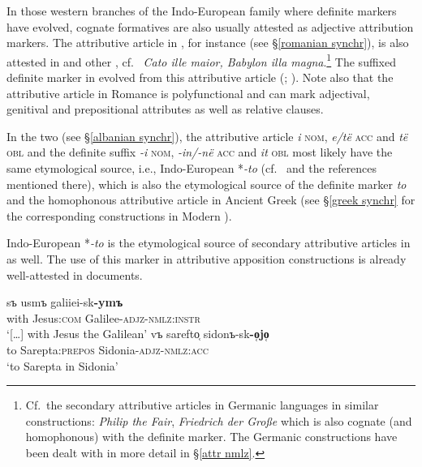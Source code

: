 {\largerpage
In those western branches of the Indo-European family where definite markers have evolved, cognate formatives are also usually attested as adjective attribution markers. The attributive article in , for instance (see \S\ref{romanian synchr}), is also attested in  and other , cf.~ \textit{Cato ille maior, Babylon illa magna}.\footnote{Cf.~the secondary attributive articles in Germanic languages in similar constructions:  \textit{Philip the Fair},  \textit{Friedrich der Große} which is also cognate (and homophonous) with the definite marker. The Germanic constructions have been dealt with in more detail in \S\ref{attr nmlz}.} The suffixed definite marker in  evolved from this attributive article (\citealt{gamillscheg1937}; \citealt[5]{nocentini1996}). Note also that the attributive article in Romance is polyfunctional and can mark adjectival, genitival and prepositional attributes as well as relative clauses.

In the two  (see \S\ref{albanian synchr}), the attributive article \textit{i} \textsc{nom}, \textit{e/të} \textsc{acc} and \textit{të} \textsc{obl} and the definite suffix \textit{-i} \textsc{nom}, \textit{-in/-në} \textsc{acc} and \textit{it} \textsc{obl} most likely have the same etymological source, i.e., Indo-European *\textit{-to} (cf.~\citealt[165]{himmelmann1997} and the references mentioned there), which is also the etymological source of the definite marker \textit{to} and the homophonous attributive article in Ancient Greek (see \S\ref{greek synchr} for the corresponding constructions in Modern ).

Indo-European *\textit{-to} is the etymological source of secondary attributive articles in  as well. The use of this marker in attributive apposition constructions is already well-attested in  documents.
\begin{exe}
\begin{xlist}
\ex
\gll	[\dots] sъ usmъ galiiei-sk\textbf{-ymъ}\\
	{ } with Jesus:\textsc{com} Galilee-\textsc{adjz}-\textsc{nmlz:instr}\\
\glt 	‘[\dots] with Jesus the Galilean’ \citep[Matthew 26, cit.][214]{mendoza2004}
\ex 
\gll	vъ sarefto̜ sidonъ-sk\textbf{-o̜jo̜}\\
	to Sarepta:\textsc{prepos} Sidonia-\textsc{adjz}-\textsc{nmlz:acc}\\
\glt 	‘to Sarepta in Sidonia’ \citep[Luke 4, cit.][214]{mendoza2004}
\end{xlist}
\end{exe}

}
